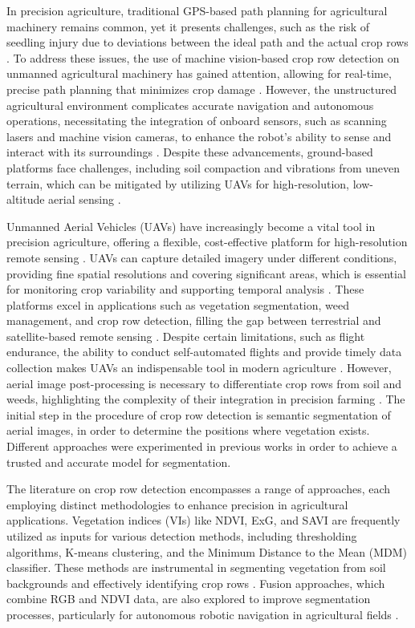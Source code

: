 \documentclass[conference]{IEEEtran}
\begin{document}
In precision agriculture, traditional GPS-based path planning for agricultural machinery remains common, yet it presents challenges, such as the risk of seedling injury due to deviations between the ideal path and the actual crop rows \cite{b1}. To address these issues, the use of machine vision-based crop row detection on unmanned agricultural machinery has gained attention, allowing for real-time, precise path planning that minimizes crop damage \cite{b1,b8}. However, the unstructured agricultural environment complicates accurate navigation and autonomous operations, necessitating the integration of onboard sensors, such as scanning lasers and machine vision cameras, to enhance the robot's ability to sense and interact with its surroundings \cite{b2,b3}. Despite these advancements, ground-based platforms face challenges, including soil compaction and vibrations from uneven terrain, which can be mitigated by utilizing UAVs for high-resolution, low-altitude aerial sensing \cite{b10}.

Unmanned Aerial Vehicles (UAVs) have increasingly become a vital tool in precision agriculture, offering a flexible, cost-effective platform for high-resolution remote sensing  \cite{b9,b12}. UAVs can capture detailed imagery under different conditions, providing fine spatial resolutions and covering significant areas, which is essential for monitoring crop variability and supporting temporal analysis \cite{b10,b12}. These platforms excel in applications such as vegetation segmentation, weed management, and crop row detection, filling the gap between terrestrial and satellite-based remote sensing \cite{b7,b13}. Despite certain limitations, such as flight endurance, the ability to conduct self-automated flights and provide timely data collection makes UAVs an indispensable tool in modern agriculture \cite{b11,b13}. However, aerial image post-processing is necessary to differentiate crop rows from soil and weeds, highlighting the complexity of their integration in precision farming \cite{b6}.
The initial step in the procedure of crop row detection is semantic segmentation of aerial images, in order to determine the positions where vegetation exists. Different approaches were experimented in previous works in order to achieve a trusted and accurate model for segmentation. 


The literature on crop row detection encompasses a range of approaches, each employing distinct methodologies to enhance precision in agricultural applications. Vegetation indices (VIs) like NDVI, ExG, and SAVI are frequently utilized as inputs for various detection methods, including thresholding algorithms, K-means clustering, and the Minimum Distance to the Mean (MDM) classifier. These methods are instrumental in segmenting vegetation from soil backgrounds and effectively identifying crop rows \cite{b1,b6,b13}. Fusion approaches, which combine RGB and NDVI data, are also explored to improve segmentation processes, particularly for autonomous robotic navigation in agricultural fields \cite{b5}.
\end{document}
